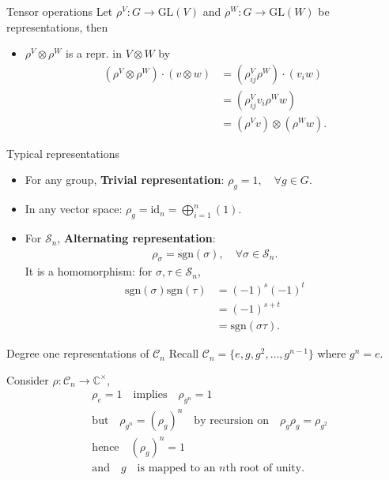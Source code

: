 \documentclass[handout,  12pt]{beamer}
\newcommand{\CC}{\mathbb{C}}
\newcommand{\1}{\mathbf{1}}
\newcommand{\0}{\mathbf{0}}
\newcommand{\GL}{\text{GL}}
\newcommand{\id}{\text{id}}
\newcommand{\Sym}{\mathcal{S}} %
\newcommand{\Cyc}{\mathcal{C}}%
\newcommand{\sgn}{\text{sgn}}
\begin{document}
	\begin{frame}{Tensor operations}
		Let $\rho^V: G \rightarrow \GL(V)$ and $\rho^W: G \rightarrow \GL(W)$ be representations, then 
		\begin{itemize}
			\item $\rho^V \otimes \rho^W$ is a repr. in $V \otimes W$ by
			\begin{align*}
				(\rho^V \otimes \rho^W) \cdot (v \otimes w) &= (\rho^V_{ij} \rho^W) \cdot (v_i w) \\
				&= (\rho^V_{ij}v_i \rho^Ww) \\
				&= (\rho^V v) \otimes (\rho^W w).
			\end{align*}
		\end{itemize}
	\end{frame}
	
	\begin{frame}{Typical representations}
		\begin{itemize}
			\item For any group, \textbf{Trivial representation}: $\rho_g = 1, \quad \forall g \in G$.
			\item In any vector space: $\rho_g = \id_n = \bigoplus_{i=1}^{n} (1)$.
			\item For $\Sym_n$, \textbf{Alternating representation}:
			\begin{align*}
				\rho_\sigma = \sgn(\sigma), \quad \forall \sigma \in \Sym_n.
			\end{align*}
			It is a homomorphism: for $\sigma, \tau \in \Sym_n$,
			\begin{align*}
				\sgn(\sigma)\sgn(\tau) &= (-1)^s(-1)^t \\
				&= (-1)^{s+t} \\
				&= \sgn(\sigma\tau).
			\end{align*}
		\end{itemize}
	\end{frame}
	
	\begin{frame}{Degree one representations of $\Cyc_n$}
		Recall $\Cyc_n = \{e, g, g^2, \dots, g^{n-1}\}$ where $g^n = e$.
		
		Consider $\rho: \Cyc_n \rightarrow \CC^\times$,
		\begin{align*}
			&\rho_e = 1 \quad \text{implies} \quad \rho_{g^n} = 1 \\
			&\text{but} \quad \rho_{g^n} = (\rho_g)^n \quad \text{by recursion on} \quad \rho_g\rho_g = \rho_{g^2} \\
			&\text{hence} \quad (\rho_g)^n = 1 \\
			&\text{and} \quad g \quad \text{is mapped to an $n$th root of unity.}
		\end{align*}
	\end{frame}
	
\end{document}
